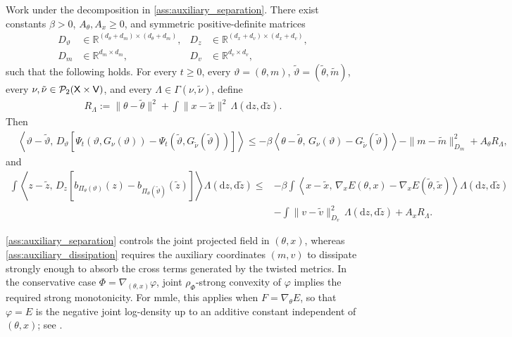 \begin{assumption}
\label{ass:auxiliary_dissipation}
Work under the decomposition in
\ref{ass:auxiliary_separation}.  There exist constants
$\beta>0$, $A_\theta,A_x\geq0$, and symmetric positive-definite matrices
\begin{align*}
D_\vartheta&\in
\mathbb R^{(d_\theta+d_m)\times(d_\theta+d_m)},&
D_z&\in
\mathbb R^{(d_x+d_v)\times(d_x+d_v)},\\
D_m&\in\mathbb R^{d_m\times d_m},&
D_v&\in\mathbb R^{d_v\times d_v},
\end{align*}
such that the following holds.  For every $t\geq0$, every
$\vartheta=(\theta,m)$, $\tilde\vartheta=(\tilde\theta,\tilde m)$, every
$\nu,\tilde\nu\in\mathcal P_2({\mathsf{X}}\times{\mathsf{V}})$, and every
$\Lambda\in\Gamma(\nu,\tilde\nu)$, define
\begin{align*}
R_\Lambda
:=
\|\theta-\tilde\theta\|^2
+
\int\|x-\tilde x\|^2\,
\Lambda(\mathrm dz,\mathrm d\tilde z).
\end{align*}
Then
\begin{equation}
\label{eq:optimiser_auxiliary_dissipation}
\begin{aligned}
&\left\langle
\vartheta-\tilde\vartheta,\,
D_\vartheta
\left[
\Psi_t(\vartheta,G_\nu(\vartheta))
-\Psi_t(\tilde\vartheta,G_{\tilde\nu}(\tilde\vartheta))
\right]
\right\rangle\leq
-\beta
\left\langle
\theta-\tilde\theta,\,
G_\nu(\vartheta)-G_{\tilde\nu}(\tilde\vartheta)
\right\rangle
-\|m-\tilde m\|_{D_m}^2
+A_\theta R_\Lambda,
\end{aligned}
\end{equation}
and
\begin{equation}
\label{eq:sampler_auxiliary_dissipation}
\begin{aligned}
\int
\left\langle
z-\tilde z,\,
D_z
\left[
b_{\Pi_\theta(\vartheta)}(z)
-b_{\Pi_\theta(\tilde\vartheta)}(\tilde z)
\right]
\right\rangle
\Lambda(\mathrm dz,\mathrm d\tilde z) \leq &
-\beta
\int
\left\langle
x-\tilde x,\,
\nabla_xE(\theta,x)-\nabla_xE(\tilde\theta,\tilde x)
\right\rangle
\Lambda(\mathrm dz,\mathrm d\tilde z)\\
&
-\int\|v-\tilde v\|_{D_v}^2\,
\Lambda(\mathrm dz,\mathrm d\tilde z)
+A_x R_\Lambda.
\end{aligned}
\end{equation}
\end{assumption}

\ref{ass:auxiliary_separation} controls the joint projected field
in $(\theta,x)$, whereas
\ref{ass:auxiliary_dissipation} requires the auxiliary coordinates
$(m,v)$ to dissipate strongly enough to absorb the cross terms generated by
the twisted metrics.  In the conservative case
$\Phi=\nabla_{(\theta,x)}\varphi$, joint
$\rho_\Phi$-strong convexity of $\varphi$ implies the required strong
monotonicity.  For \gls*{mmle}, this applies when $F=\nabla_\theta E$, so
that $\varphi=E$ is the negative joint log-density up to an additive
constant independent of $(\theta,x)$;
see \citet{pmlr-v206-kuntz23a,akyildiz2025interacting}.

